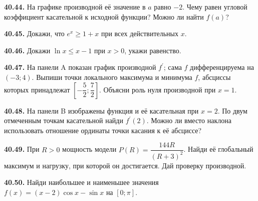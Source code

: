 \noindent\begin{minipage}[t]{\linewidth}\textbf{40.44.} На графике производной её значение в \(a\) равно \(-2\). Чему равен угловой коэффициент касательной к исходной функции? Можно ли найти \(f(a)\)?\par\end{minipage}\par
\noindent\begin{minipage}[t]{\linewidth}\textbf{40.45.}\starmark{} Докажи, что \(e^x\ge1+x\) при всех действительных \(x\).\par\end{minipage}\par
\noindent\begin{minipage}[t]{\linewidth}\textbf{40.46.}\starmark{} Докажи \(\ln x\le x-1\) при \(x>0\), укажи равенство.\par\end{minipage}\par
\noindent\begin{minipage}[t]{\linewidth}\textbf{40.47.}\starmark{} На панели A показан график производной \(f^{\prime}\); сама \(f\) дифференцируема на \((-3;4)\). Выпиши точки локального максимума и минимума \(f\), абсциссы которых принадлежат \([-\dfrac52;\dfrac72]\). Объясни роль нуля производной при \(x=1\).\par\end{minipage}\par
\noindent\begin{minipage}[t]{\linewidth}\textbf{40.48.} На панели B изображены функция и её касательная при \(x=2\). По двум отмеченным точкам касательной найди \(f^{\prime}(2)\). Можно ли вместо наклона использовать отношение ординаты точки касания к её абсциссе?\par\end{minipage}\par
\noindent\begin{minipage}[t]{\linewidth}\textbf{40.49.}\starmark{} При \(R>0\) мощность модели \(P(R)=\dfrac{144R}{(R+3)^2}\). Найди её глобальный максимум и нагрузку, при которой он достигается. Дай проверку производной.\par\end{minipage}\par
\noindent\begin{minipage}[t]{\linewidth}\textbf{40.50.}\starmark{} Найди наибольшее и наименьшее значения \(f(x)=(x-2)\cos x-\sin x\) на \([0;\pi]\).\par\end{minipage}\par
